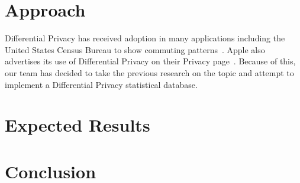 \documentclass{IEEEtran}
\begin{document}
\section{Approach}
Differential Privacy has received adoption in many applications including the
United States Census Bureau to show commuting
patterns~\cite{Machanavajjhala:2008}. Apple also advertises its use of
Differential Privacy on their Privacy page~\cite{Apple:2017}. Because of this,
our team has decided to take the previous research on the topic and attempt to
implement a Differential Privacy statistical database.

\section{Expected Results}

\section{Conclusion}


\printbibliography
\end{document}
